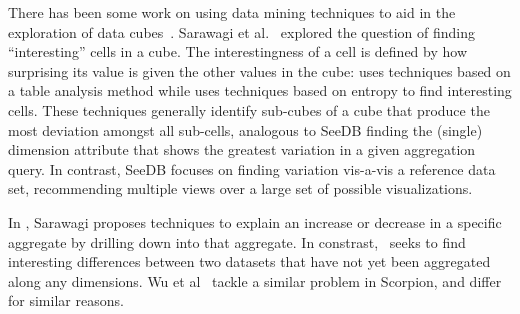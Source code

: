 There has been some  work on using data mining techniques
to aid in the exploration of data 
cubes~\cite{DBLP:conf/vldb/Sarawagi99, DBLP:conf/vldb/SatheS01, DBLP:conf/vldb/Sarawagi00, 
DBLP:conf/SIGKDD/OrdonezC09}.
Sarawagi et al.~\cite{DBLP:conf/EDBT/SarawagiAM98, DBLP:conf/vldb/Sarawagi00} 
 explored 
the question of finding ``interesting'' cells in a cube.
The interestingness of a cell is defined by how surprising
its value is given the other values in the cube:
\cite{DBLP:conf/EDBT/SarawagiAM98} uses techniques 
based on a table analysis method while
\cite{DBLP:conf/vldb/Sarawagi00} uses techniques based on entropy to find interesting cells.
These techniques generally identify sub-cubes of a cube that produce the most
deviation amongst all sub-cells, analogous to SeeDB finding the (single) dimension attribute that shows the greatest variation in a given
aggregation query.  In contrast, SeeDB focuses on
 finding variation vis-a-vis a reference data set, recommending multiple views over a large set of possible visualizations.



In \cite{DBLP:conf/vldb/Sarawagi99}, Sarawagi
proposes techniques to explain an
increase or decrease in a specific aggregate by drilling down into that aggregate.
In constrast, \SeeDB\ seeks to find interesting
differences between two datasets that have not yet been aggregated along any dimensions.
Wu et al~\cite{scorpion} tackle a similar problem in Scorpion,
and differ for similar reasons.


